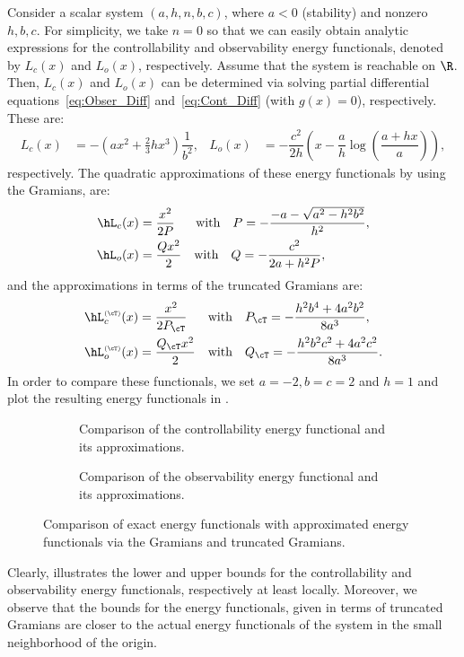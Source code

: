 \begin{example}
 Consider a scalar system $(a,h,n,b,c)$, where $a<0$ (stability) and nonzero $h,b,c$. For simplicity, we take $n = 0$ so that we can easily obtain analytic expressions for the controllability  and observability energy functionals, denoted by $L_c(x)$ and $L_o(x)$, respectively. Assume that the system is reachable on $\R$. Then, $L_c(x)$ and $L_o(x)$ can be  determined via solving partial differential equations~\eqref{eq:Obser_Diff} and~\eqref{eq:Cont_Diff} (with $g(x) = 0$), respectively. These are:
 \begin{align*}
  L_c(x) &= - \left(ax^2  + \tfrac{2}{3}hx^3\right)\dfrac{1}{b^2},&
  L_o(x) &= -\dfrac{c^2}{2h}\left(x - \dfrac{a}{h}\log\left(\dfrac{a+hx}{a}\right)\right),
 \end{align*}
 respectively. The quadratic approximations of these energy functionals by using the Gramians, are:
\begin{align*}
\hL_c(x) &= \dfrac{x^2}{2P} \quad ~~ \text{with} \quad P = -\dfrac{-a - \sqrt{a^2 - h^2b^2}}{h^2},\\
\hL_o(x) &= \dfrac{Qx^2}{2}\quad \text{with} \quad Q = -\dfrac{c^2}{2a+h^2P},
\end{align*}
and  the approximations in terms of the truncated Gramians are:
\begin{align*}
\hL^{\scriptscriptstyle(\cT)}_c(x) &= \dfrac{x^2}{2P_\cT}\quad ~~ \text{with} \quad P_\cT = -\dfrac{h^2b^4+4a^2b^2}{8a^3},\\
\hL^{ {\scriptscriptstyle{(\cT)}} }_o(x) &= \dfrac{Q_\cT x^2}{2}\quad \text{with} \quad Q_\cT  = -\dfrac{h^2b^2c^2+4a^2c^2}{8a^3}.
\end{align*}
In order to compare these functionals, we set $a =-2,b=c=2$ and $h =1$ and plot the resulting energy functionals  in .

\begin{figure}[!tb]
 \begin{subfigure}[h]{0.49\textwidth}
\centering
	\setlength\fheight{3cm}
	\setlength{}
	\caption{Comparison of the controllability energy functional  and its approximations.}
   \end{subfigure}
    \begin{subfigure}[h]{0.49\textwidth}
\centering
	\setlength\fheight{3cm}
	\setlength\fwidth{5.0cm}
	\caption{Comparison of the observability energy functional and its approximations.}
   \end{subfigure}
   \caption{Comparison of exact energy functionals with approximated energy functionals via the Gramians and truncated Gramians.}
   \label{fig:comparison_gram}
\end{figure}

Clearly,  illustrates the lower and upper bounds for the controllability and observability energy functionals, respectively at least locally. Moreover, we observe that the bounds for the energy functionals, given in terms of truncated Gramians are  closer to the actual energy functionals of the system in the small neighborhood of the origin. 
 \end{example}
